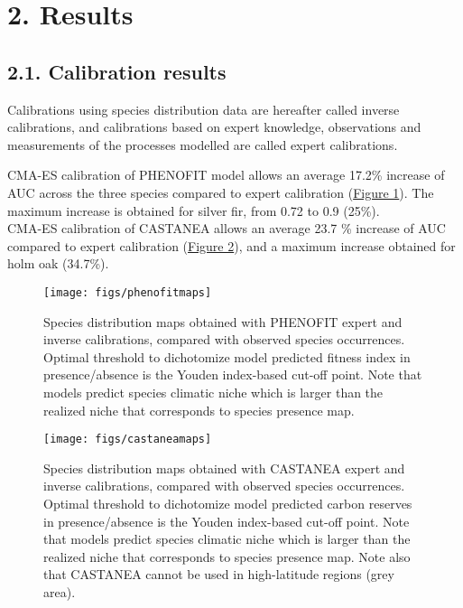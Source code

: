 \documentclass[11pt,]{article}
\begin{document}
\hypertarget{results}{%
\section{2. Results}\label{results}}

\hypertarget{calibration-results}{%
\subsection{2.1. Calibration results}\label{calibration-results}}

Calibrations using species distribution data are hereafter called
inverse calibrations, and calibrations based on expert knowledge,
observations and measurements of the processes modelled are called
expert calibrations.

CMA-ES calibration of PHENOFIT model allows an average 17.2\% increase
of AUC across the three species compared to expert calibration
(\hyperref[fig:phenofitmaps]{Figure 1}). The maximum increase is
obtained for silver fir, from 0.72 to 0.9 (25\%).\\
CMA-ES calibration of CASTANEA allows an average 23.7 \% increase of AUC
compared to expert calibration (\hyperref[fig:castaneamaps]{Figure 2}),
and a maximum increase obtained for holm oak (34.7\%).

\begin{figure}[H]

{\centering \texttt{[image: figs/phenofitmaps]} 

}

\caption{Species distribution maps obtained with PHENOFIT expert and inverse calibrations, compared with observed species occurrences. Optimal threshold to dichotomize model predicted fitness index in presence/absence is the Youden index-based cut-off point. Note that models predict species climatic niche which is larger than the realized niche that corresponds to species presence map.}\label{fig:phenofitmaps}
\end{figure}

\begin{figure}[H]

{\centering \texttt{[image: figs/castaneamaps]} 

}

\caption{Species distribution maps obtained with CASTANEA expert and inverse calibrations, compared with observed species occurrences. Optimal threshold to dichotomize model predicted carbon reserves in presence/absence is the Youden index-based cut-off point. Note that models predict species climatic niche which is larger than the realized niche that corresponds to species presence map. Note also that CASTANEA cannot be used in high-latitude regions (grey area).}\label{fig:castaneamaps}
\end{figure}
\end{document}
